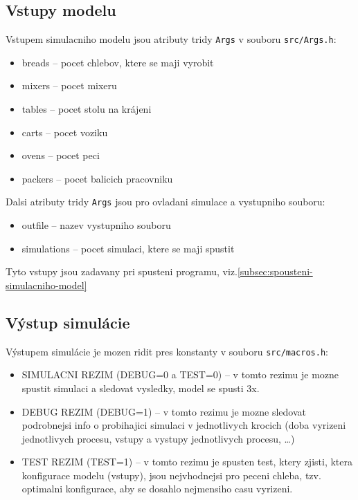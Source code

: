 \documentclass[a4paper, 10pt]{article}
\begin{document}
    \subsection{Vstupy modelu}
    Vstupem simulacniho modelu jsou atributy tridy \texttt{Args} v souboru \texttt{src/Args.h}:
    \begin{itemize}
        \item breads -- pocet chlebov, ktere se maji vyrobit
        \item mixers -- pocet mixeru
        \item tables -- pocet stolu na krájeni
        \item carts -- pocet voziku
        \item ovens -- pocet peci
        \item packers -- pocet balicich pracovniku
    \end{itemize}

    Dalsi atributy tridy \texttt{Args} jsou pro ovladani simulace a vystupniho souboru:
    \begin{itemize}
        \item outfile -- nazev vystupniho souboru
        \item simulations -- pocet simulaci, ktere se maji spustit
    \end{itemize}

    Tyto vstupy jsou zadavany pri spusteni programu, viz.\ref{subsec:spousteni-simulacniho-model}

    \subsection{Výstup simulácie}
    Výstupem simulácie je mozen ridit pres konstanty v souboru \texttt{src/macros.h}:
    \begin{itemize}
        \item SIMULACNI REZIM (DEBUG=0 a TEST=0) -- v tomto rezimu je mozne spustit simulaci a sledovat vysledky, model se spusti 3x.
        \item DEBUG REZIM (DEBUG=1) -- v tomto rezimu je mozne sledovat podrobnejsi info o probihajici simulaci
        v jednotlivych krocich (doba vyrizeni jednotlivych procesu, vstupy a vystupy jednotlivych procesu, \ldots)
        \item TEST REZIM (TEST=1) -- v tomto rezimu je spusten test, ktery zjisti, ktera konfigurace modelu (vstupy),
        jsou nejvhodnejsi pro peceni chleba, tzv. optimalni konfigurace, aby se dosahlo nejmensiho casu vyrizeni.
    \end{itemize}
\end{document}
